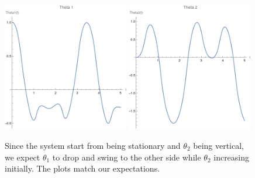 \documentclass[11pt]{article}
\begin{document}
~\begin{figure}[H]
	\centering
	\includegraphics[width=0.49\textwidth]{./figures/hw6.1.png}
	\includegraphics[width=0.49\textwidth]{./figures/hw6.2.png}
	\caption{Since the system start from being stationary and $ \theta_2$ being vertical, we expect $ \theta_1$ to drop and swing to the other side while $ \theta_2$ increasing initially. The plots match our expectations.}
\end{figure}
\end{document}
